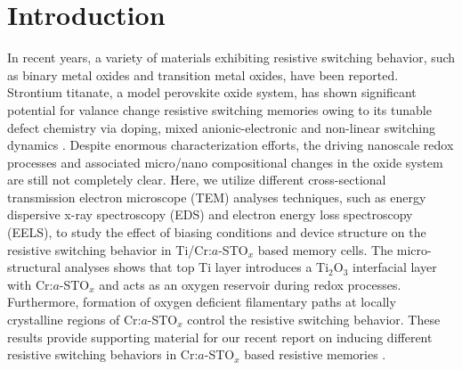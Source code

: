 \documentclass{osa-article}
\begin{document}
\section*{Introduction}
In recent years, a variety of materials exhibiting resistive switching behavior, such as binary metal oxides and transition metal oxides, have been reported. Strontium titanate, a model perovskite oxide system, has shown significant potential for valance change resistive switching memories owing to its tunable defect chemistry via doping, mixed anionic-electronic and non-linear switching dynamics \cite{Nili,Tech,arx2018,Nano2017}. Despite enormous characterization efforts, the driving nanoscale redox processes and associated micro/nano compositional changes in the oxide system are still not completely clear. Here, we utilize different cross-sectional transmission electron microscope (TEM) analyses techniques, such as energy dispersive x-ray spectroscopy (EDS) and electron energy loss spectroscopy (EELS), to study the effect of biasing conditions and device structure on the resistive switching behavior in Ti/Cr:$a$-STO$_{x}$ based memory cells. The micro-structural analyses shows that top Ti layer introduces a Ti$_{2}$O$_{3}$  interfacial layer with Cr:$a$-STO$_{x}$ and acts as an oxygen reservoir during redox processes. Furthermore, formation of oxygen deficient filamentary paths at locally crystalline regions of Cr:$a$-STO$_{x}$ control the resistive switching behavior. These results provide supporting material for our recent report on inducing different resistive switching behaviors in Cr:$a$-STO$_{x}$ based resistive memories \cite{CrSTO}. 
\end{document}
